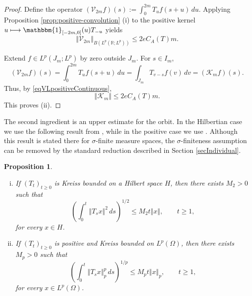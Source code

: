 \documentclass[12pt]{amsart}
\theoremstyle{plain}
\newtheorem{prop}[thm]{Proposition}
\theoremstyle{remark}
\theoremstyle{definition}
\newcommand{\R}{\mathbb{R}}
\newcommand{\one}{\mathbbm{1}}
\newcommand{\norm}[1]{\left\Vert #1\right\Vert}
\begin{document}
\begin{proof}
		Define the operator $(\mathcal V_{2m}f)(s) := \int_0^{2m}T_uf(s+u)\,du$. Applying Proposition \ref{prop:positive-convolution} (i) to the positive kernel $u\longmapsto \one_{[-2m,0]}(u)T_{-u}$ yields
		\begin{equation}\label{eqVLpositiveContinuous}
			\norm{\mathcal V_{2m}}_{B(L^p(\R;L^p))}
			\le
			2eC_A(T)m.
		\end{equation}
		
		Extend $f\in L^p(J_m;L^p)$ by zero outside $J_m$. For $s\in I_m$,
		\begin{equation}\label{eqFinalSec}
			(\mathcal V_{2m}f)(s)
			=
			\int_0^{2m}T_uf(s+u)\,du
			=
			\int_{J_m}T_{v-s}f(v)\,dv
			=
			(\mathcal K_mf)(s).
		\end{equation}
		Thus, by \eqref{eqVLpositiveContinuous},
		\[
		\norm{\mathcal K_m}
		\le
		2eC_A(T)m.
		\]
		This proves (ii).
	\end{proof}
	
	The second ingredient is an upper estimate for the orbit. In the Hilbertian
	case we use the following result from \cite{Arnold2022}, while in the positive case we use \cite[Proposition 3.2]{ArnoldCoine2023}.
	Although this result is stated there for $\sigma$-finite measure spaces, the
	$\sigma$-finiteness assumption can be removed by the standard reduction
	described in Section \ref{secIndividual}.
	
	
	\begin{prop}\label{propOrbitContinuous}
		\begin{enumerate}[(i)]
			\item
			If $(T_t)_{t\ge0}$ is Kreiss bounded on a Hilbert space $H$, then there
			exists $M_2>0$ such that
			\begin{equation*}\label{eqOrbitContinuousH}
				\left(
				\int_0^t\norm{T_sx}^2\,ds
				\right)^{1/2}
				\le
				M_2t\norm{x},
				\qquad t\ge1,
			\end{equation*}
			for every $x\in H$.
			
			\item
			If $(T_t)_{t\ge0}$ is positive and Kreiss bounded on $L^p(\Omega)$, then
			there exists $M_p>0$ such that
			\begin{equation*}\label{eqOrbitPositiveContinuous}
				\left(
				\int_0^t\norm{T_sx}_p^p\,ds
				\right)^{1/p}
				\le
				M_pt\norm{x}_p,
				\qquad t\ge1,
			\end{equation*}
			for every $x\in L^p(\Omega)$.
		\end{enumerate}
	\end{prop}
	
\end{document}
